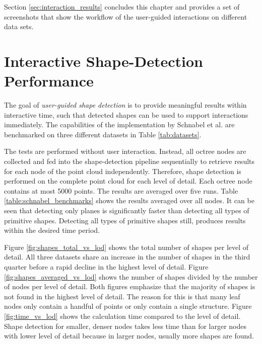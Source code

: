 Section \ref{sec:interaction_results} concludes this chapter and provides a set of screenshots that show the workflow of the user-guided interactions on different data sets. 


\section{Interactive Shape-Detection Performance}
\label{sec:shape_detection_performance}

The goal of \textit{user-guided shape detection} is to provide meaningful results within interactive time, such that detected shapes can be used to support interactions immediately. The capabilities of the implementation by Schnabel et al. \cite{schnabel-2007-software} are benchmarked on three different datasets in Table \ref{tab:datasets}. 

\par

The tests are performed without user interaction. Instead, all octree nodes are collected and fed into the shape-detection pipeline sequentially to retrieve results for each node of the point cloud independently. Therefore, shape detection is performed on the complete point cloud for each level of detail. Each octree node contains at most 5000 points. The results are averaged over five runs. Table \ref{table:schnabel_benchmarks} shows the results averaged over all nodes. It can be seen that detecting only planes is significantly faster than detecting all types of primitive shapes. Detecting all types of primitive shapes still, produces results within the desired time period. 

\par

Figure \ref{fig:shapes_total_vs_lod} shows the total number of shapes per level of detail. All three datasets share an increase in the number of shapes in the third quarter before a rapid decline in the highest level of detail. 
Figure \ref{fig:shapes_averaged_vs_lod} shows the number of shapes divided by the number of nodes per level of detail. Both figures emphasize that the majority of shapes is not found in the highest level of detail. The reason for this is that many leaf nodes only contain a handful of points or only contain a single structure. 
Figure \ref{fig:time_vs_lod} shows the calculation time compared to the level of detail. Shape detection for smaller, denser nodes takes less time than for larger nodes with lower level of detail because in larger nodes, usually more shapes are found. 

